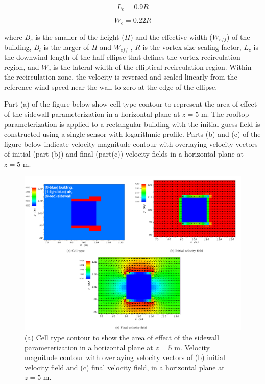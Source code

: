 \begin{equation}
L_{\mathrm{c}}=0.9 R
\end{equation}

\begin{equation}
W_{\mathrm{c}}=0.22 R
\end{equation}

where $B_s$ is the smaller of the height ($H$) and the effective width ($W_{eff}$) of the
building, $B_l$ is the larger of $H$ and $W_{eff}$ , $R$ is the vortex size scaling factor, $L_c$ is the downwind length of the half-ellipse that defines the vortex recirculation region, and
$W_c$ is the lateral width of the elliptical recirculation region. Within the recirculation zone, the velocity is reversed and scaled linearly from the reference wind speed near the wall to zero at the edge of the ellipse.

Part (a) of the figure below show cell type contour to represent the area of effect of the sidewall parameterization in a horizontal plane at $z=5$ m. The rooftop parameterization is applied to a rectangular building with the initial guess field is constructed using a single sensor with logarithmic profile. Parts (b) and (c) of the figure below indicate velocity magnitude contour with overlaying velocity vectors of initial (part (b)) and final (part(c)) velocity fields in a horizontal plane at $z=5$ m.

\begin{figure}[H]
    \includegraphics[width=\textwidth]{Images/sidewall_z_5_1.pdf}
    \caption{(a) Cell type contour to show the area of effect of the sidewall parameterization in a horizontal plane at $z=5$ m. Velocity magnitude contour with overlaying velocity vectors of (b) initial velocity field and (c) final velocity field, in a horizontal plane at $z=5$ m.}
\end{figure}

